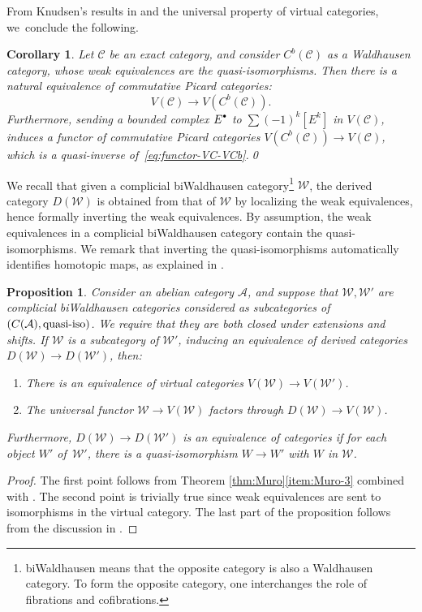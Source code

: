 \documentclass[JEP,XML,SOM,Unicode,published]{cedram}
\newcommand{\sbullet}{{\scriptscriptstyle\bullet}}
\newcommand{\csbullet}{{\raisebox{1pt}{$\sbullet$}}}
\theoremstyle{plain}
\newtheorem{proposition}[theorem]{Proposition}
\newtheorem{corollary}[theorem]{Corollary}
\theoremstyle{definition}
\newcommand{\Acal}{\mathcal A}
\newcommand{\Ccal}{\mathcal C}
\newcommand{\Wcal}{\mathcal W}
\begin{document}
From Knudsen's results in \cite{Knudsen} and the universal property of virtual categories, we~conclude the following.
\begin{corollary}\label{cor:equivalence-virtual-C-Cb}
Let $\Ccal$ be an exact category, and consider $C^{b}(\Ccal)$ as a Waldhausen category, whose weak equivalences are the quasi-isomorphisms. Then there is a natural equivalence of commutative Picard categories:
\begin{equation}\label{eq:functor-VC-VCb}
V(\Ccal) \to V(C^b(\Ccal)).
\end{equation}
Furthermore, sending a bounded complex $E^{\csbullet}$ to $\sum (-1)^{k}[E^{k}]$ in $V(\Ccal)$, induces a functor of commutative Picard categories $V(C^{b}(\Ccal))\to V(\Ccal)$, which is a quasi-inverse of~\eqref{eq:functor-VC-VCb}.\qed
\end{corollary}

We recall that given a complicial biWaldhausen category\footnote{biWaldhausen means that the opposite category is also a Waldhausen category. To form the opposite category, one interchanges the role of fibrations and cofibrations.} $\Wcal$, the derived category $D(\Wcal)$ is obtained from that of $\Wcal$ by localizing the weak equivalences, hence formally inverting the weak equivalences. By assumption, the weak equivalences in a complicial biWaldhausen category contain the quasi-isomorphisms. We remark that inverting the quasi-isomorphisms automatically identifies homotopic maps, as explained in \cite[.6]{ThomasonTrobaugh}.

\begin{proposition}\label{prop:derivedvirtual}
Consider an abelian category $\Acal$, and suppose that $\Wcal, \Wcal'$ are complicial biWaldhausen categories considered as subcategories of $(C(\Acal), \hbox{quasi-iso})$. We require that they are both closed under extensions and shifts. If $\Wcal$ is a subcategory of $\Wcal'$, inducing an equivalence of derived categories $D(\Wcal) \to D(\Wcal')$, then:

\begin{enumerate}
\item There is an equivalence of virtual categories $V(\Wcal)\to V(\Wcal')$.
\item The universal functor $\Wcal \to V(\Wcal)$ factors through $D(\Wcal)\to V(\Wcal)$.
\end{enumerate}
Furthermore, $D(\Wcal) \to D(\Wcal')$ is an equivalence of categories if for each object $W'$ of~$\Wcal'$, there is a quasi-isomorphism $W \to W'$ with $W$ in $\Wcal$.

\end{proposition}
\begin{proof}
The first point follows from Theorem \ref{thm:Muro}\eqref{item:Muro-3} combined with \cite[Th.\,1.9.8 \& Ex.\,1.3.6]{ThomasonTrobaugh}. The second point is trivially true since weak equivalences are sent to isomorphisms in the virtual category. The last part of the proposition follows from the discussion in \cite[.7]{ThomasonTrobaugh}.
\end{proof}
\end{document}
